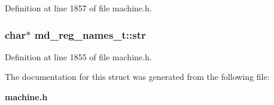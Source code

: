 Definition at line 1857 of file machine.h.
\subsubsection[{str}]{\setlength{\rightskip}{0pt plus 5cm}char$\ast$ {\bf md\_\-reg\_\-names\_\-t::str}}\label{structmd__reg__names__t_e8be66f6e3b5516bf30e4223d631860c}




Definition at line 1855 of file machine.h.

The documentation for this struct was generated from the following file:\begin{CompactItemize}
\item 
{\bf machine.h}\end{CompactItemize}
